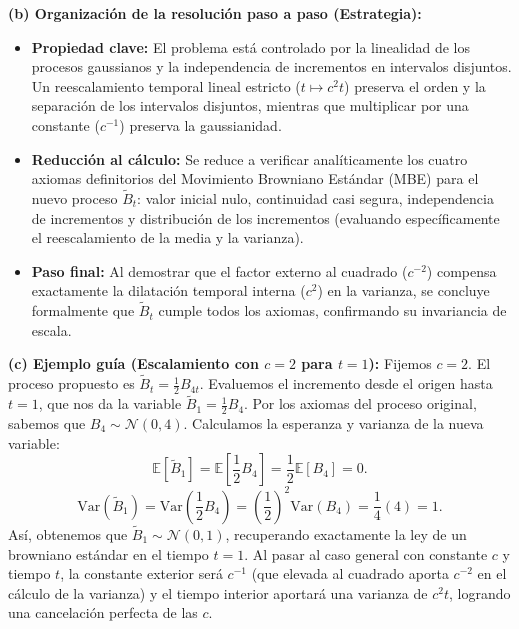 \documentclass[11pt, letterpaper]{article}
\begin{document}
\begin{solucion}
    \textbf{(b) Organización de la resolución paso a paso (Estrategia):}
    \begin{itemize}
        \item[(i)] \textbf{Propiedad clave:} El problema está controlado por la linealidad de los procesos gaussianos y la independencia de incrementos en intervalos disjuntos. Un reescalamiento temporal lineal estricto ($t \mapsto c^2 t$) preserva el orden y la separación de los intervalos disjuntos, mientras que multiplicar por una constante ($c^{-1}$) preserva la gaussianidad.
        \item[(ii)] \textbf{Reducción al cálculo:} Se reduce a verificar analíticamente los cuatro axiomas definitorios del Movimiento Browniano Estándar (MBE) para el nuevo proceso $\tilde{B}_t$: valor inicial nulo, continuidad casi segura, independencia de incrementos y distribución de los incrementos (evaluando específicamente el reescalamiento de la media y la varianza).
        \item[(iii)] \textbf{Paso final:} Al demostrar que el factor externo al cuadrado ($c^{-2}$) compensa exactamente la dilatación temporal interna ($c^2$) en la varianza, se concluye formalmente que $\tilde{B}_t$ cumple todos los axiomas, confirmando su invariancia de escala.
    \end{itemize}

    \vspace{3mm}
    \textbf{(c) Ejemplo guía (Escalamiento con $c = 2$ para $t=1$):}
    Fijemos $c = 2$. El proceso propuesto es $\tilde{B}_t = \frac{1}{2} B_{4t}$.
    Evaluemos el incremento desde el origen hasta $t=1$, que nos da la variable $\tilde{B}_1 = \frac{1}{2} B_4$.
    Por los axiomas del proceso original, sabemos que $B_4 \sim \mathcal{N}(0, 4)$.
    Calculamos la esperanza y varianza de la nueva variable:
    $$ \mathbb{E}[\tilde{B}_1] = \mathbb{E}\left[\frac{1}{2} B_4\right] = \frac{1}{2}\mathbb{E}[B_4] = 0. $$
    $$ \text{Var}(\tilde{B}_1) = \text{Var}\left(\frac{1}{2} B_4\right) = \left(\frac{1}{2}\right)^2 \text{Var}(B_4) = \frac{1}{4} (4) = 1. $$
    Así, obtenemos que $\tilde{B}_1 \sim \mathcal{N}(0, 1)$, recuperando exactamente la ley de un browniano estándar en el tiempo $t=1$. Al pasar al caso general con constante $c$ y tiempo $t$, la constante exterior será $c^{-1}$ (que elevada al cuadrado aporta $c^{-2}$ en el cálculo de la varianza) y el tiempo interior aportará una varianza de $c^2 t$, logrando una cancelación perfecta de las $c$.


\end{solucion}
\end{document}
